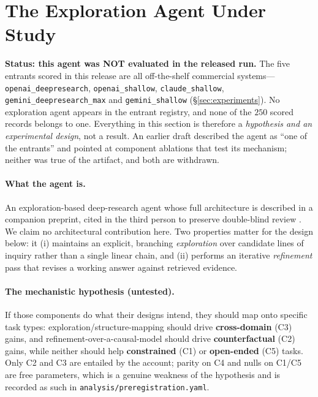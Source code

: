 \section{The Exploration Agent Under Study}
\label{sec:caesar}

\textbf{Status: this agent was NOT evaluated in the released run.} The five entrants scored in this
release are all off-the-shelf commercial systems---\texttt{openai\_deepresearch},
\texttt{openai\_shallow}, \texttt{claude\_shallow}, \texttt{gemini\_deepresearch\_max} and
\texttt{gemini\_shallow} (\S\ref{sec:experiments}). No exploration agent appears in the entrant
registry, and none of the $250$ scored records belongs to one. Everything in this section is
therefore a \emph{hypothesis and an experimental design}, not a result. An earlier draft described
the agent as ``one of the entrants'' and pointed at component ablations that test its mechanism;
neither was true of the artifact, and both are withdrawn.

\paragraph{What the agent is.} An exploration-based deep-research agent whose full architecture is
described in a companion preprint, cited in the third person to preserve double-blind review
\citep{caesar2026}. We claim no architectural contribution here. Two properties matter for the
design below: it (i) maintains an explicit, branching \emph{exploration} over candidate lines of
inquiry rather than a single linear chain, and (ii) performs an iterative \emph{refinement} pass
that revises a working answer against retrieved evidence.

\paragraph{The mechanistic hypothesis (untested).} If those components do what their designs
intend, they should map onto specific task types: exploration/structure-mapping should drive
\textbf{cross-domain} (C3) gains, and refinement-over-a-causal-model should drive
\textbf{counterfactual} (C2) gains, while neither should help \textbf{constrained} (C1) or
\textbf{open-ended} (C5) tasks. Only C2 and C3 are entailed by the account; parity on C4 and nulls
on C1/C5 are free parameters, which is a genuine weakness of the hypothesis and is recorded as such
in \texttt{analysis/preregistration.yaml}.

